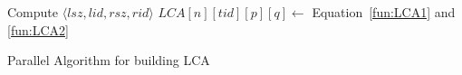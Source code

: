 \begin{algorithm}[!thb]
\SetAlgoNoLine
{}

 {
   {
     {
      Compute $\langle\mathit{lsz},\mathit{lid},\mathit{rsz},\mathit{rid}\rangle$ \;
       {
        $\textit{LCA}[n][\mathit{tid}][p][q] \gets$ Equation~\ref{fun:LCA1} and \ref{fun:LCA2} \;
      }
    }
  }
}

\caption{Parallel Algorithm for building LCA}
\label{alg:parallel-LCA}
\end{algorithm}